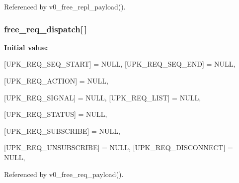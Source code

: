 Referenced by v0\_\-free\_\-repl\_\-payload().

\subsubsection[{free\_\-req\_\-dispatch}]{ {\bf free\_\-req\_\-dispatch}[$\,$]\hspace{0.3cm}{\ttfamily  [static]}}\label{upk__v0__protocol_8c_adf63201067ce0b80294fe667e57cb8b0}
{\bfseries Initial value:}
\begin{DoxyCode}
 {
    [UPK_REQ_SEQ_START] = NULL,
    [UPK_REQ_SEQ_END] = NULL,
    
    [UPK_REQ_ACTION] = NULL,
    
    [UPK_REQ_SIGNAL] = NULL,
    [UPK_REQ_LIST] = NULL,
    
    [UPK_REQ_STATUS] = NULL,
    
    [UPK_REQ_SUBSCRIBE] = NULL,
    
    [UPK_REQ_UNSUBSCRIBE] = NULL,
    [UPK_REQ_DISCONNECT] = NULL,
}
\end{DoxyCode}


Referenced by v0\_\-free\_\-req\_\-payload().

